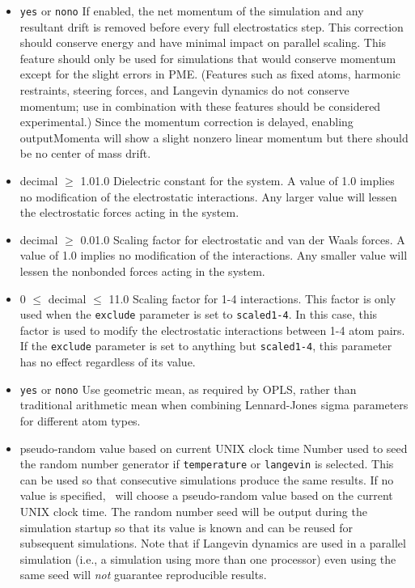 \begin{itemize}
\item
{}
{{\tt yes} or {\tt no}}{{\tt no}}
{
If enabled, the net momentum of the simulation and any resultant drift
is removed before every full electrostatics step.
This correction should conserve energy and have minimal impact on
parallel scaling.
This feature should only be used for simulations that would
conserve momentum except for the slight errors in PME.
(Features such as fixed atoms, harmonic restraints, steering forces,
and Langevin dynamics do not conserve momentum; use in combination
with these features should be considered experimental.)
Since the momentum correction is delayed, enabling outputMomenta 
will show a slight nonzero linear momentum but there should be no
center of mass drift.
}

\item
{}
{decimal $\geq$ 1.0}{1.0}
{Dielectric constant for the system.  A value of 1.0 implies no modification
of the electrostatic interactions.  Any larger value will lessen the
electrostatic forces acting in the system.}

\item
{}
{decimal $\geq$ 0.0}{1.0}
{Scaling factor for electrostatic and van der Waals forces.
A value of 1.0 implies no modification of the interactions.
Any smaller value will lessen the
nonbonded forces acting in the system.}

\item
{}
{0 $\leq$ decimal $\leq$ 1}{1.0}
{Scaling factor for 1-4 interactions.  This factor is only used when the
{\tt exclude} parameter is set to {\tt scaled1-4}.  In this case, this
factor is used to modify the electrostatic interactions between 1-4 atom
pairs.  If the {\tt exclude} parameter is set to anything but 
{\tt scaled1-4}, this parameter has no effect regardless of its value.}

\item
{}
{{\tt yes} or {\tt no}}{{\tt no}}
{Use geometric mean, as required by  OPLS, rather than
traditional arithmetic mean when combining Lennard-Jones sigma parameters
for different atom types.}

\item
{}
{pseudo-random value based on current UNIX clock time}
{Number used to seed the random number generator 
if {\tt temperature} or {\tt langevin} is selected.  This can be
used so that consecutive simulations produce the same results.
If no value is specified, \NAMD\ will choose a pseudo-random
value based on the current UNIX clock time.  The random number
seed will be output during the simulation startup so that
its value is known and can be reused for subsequent simulations.
Note that if Langevin dynamics are used in a parallel simulation 
(i.e., a simulation using more than one processor) 
even using the same seed will {\it not} guarantee reproducible results.
}


\end{itemize}
